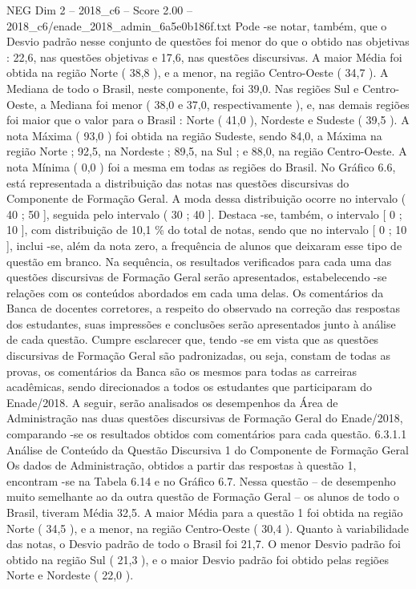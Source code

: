 \begin{textsample}{NEG Dim 2 – 2018\_c6 – Score 2.00 – 2018\_c6/enade\_2018\_admin\_6a5e0b186f.txt}
Pode -se notar, também, que o Desvio padrão nesse conjunto de questões foi menor do que o obtido nas objetivas : 22,6, nas questões objetivas e 17,6, nas questões discursivas.
A maior Média foi obtida na região Norte ( 38,8 ), e a menor, na região Centro-Oeste ( 34,7 ).
A Mediana de todo o Brasil, neste componente, foi 39,0.
Nas regiões Sul e Centro-Oeste, a Mediana foi menor ( 38,0 e 37,0, respectivamente ), e, nas demais regiões foi maior que o valor para o Brasil : Norte ( 41,0 ), Nordeste e Sudeste ( 39,5 ).
A nota Máxima ( 93,0 ) foi obtida na região Sudeste, sendo 84,0, a Máxima na região Norte ; 92,5, na Nordeste ; 89,5, na Sul ; e 88,0, na região Centro-Oeste.
A nota Mínima ( 0,0 ) foi a mesma em todas as regiões do Brasil.
No Gráfico 6.6, está representada a distribuição das notas nas questões discursivas do Componente de Formação Geral.
A moda dessa distribuição ocorre no intervalo ( 40 ; 50 ], seguida pelo intervalo ( 30 ; 40 ].
Destaca -se, também, o intervalo [ 0 ; 10 ], com distribuição de 10,1 \% do total de notas, sendo que no intervalo [ 0 ; 10 ], inclui -se, além da nota zero, a frequência de alunos que deixaram esse tipo de questão em branco.
Na sequência, os resultados verificados para cada uma das questões discursivas de Formação Geral serão apresentados, estabelecendo -se relações com os conteúdos abordados em cada uma delas.
Os comentários da Banca de docentes corretores, a respeito do observado na correção das respostas dos estudantes, suas impressões e conclusões serão apresentados junto à análise de cada questão.
Cumpre esclarecer que, tendo -se em vista que as questões discursivas de Formação Geral são padronizadas, ou seja, constam de todas as provas, os comentários da Banca são os mesmos para todas as carreiras acadêmicas, sendo direcionados a todos os estudantes que participaram do Enade/2018.
A seguir, serão analisados os desempenhos da Área de Administração nas duas questões discursivas de Formação Geral do Enade/2018, comparando -se os resultados obtidos com comentários para cada questão. 6.3.1.1 Análise de Conteúdo da Questão Discursiva 1 do Componente de Formação Geral Os dados de Administração, obtidos a partir das respostas à questão 1, encontram -se na Tabela 6.14 e no Gráfico 6.7.
Nessa questão – de desempenho muito semelhante ao da outra questão de Formação Geral – os alunos de todo o Brasil, tiveram Média 32,5.
A maior Média para a questão 1 foi obtida na região Norte ( 34,5 ), e a menor, na região Centro-Oeste ( 30,4 ).
Quanto à variabilidade das notas, o Desvio padrão de todo o Brasil foi 21,7.
O menor Desvio padrão foi obtido na região Sul ( 21,3 ), e o maior Desvio padrão foi obtido pelas regiões Norte e Nordeste ( 22,0 ).

\end{textsample}
